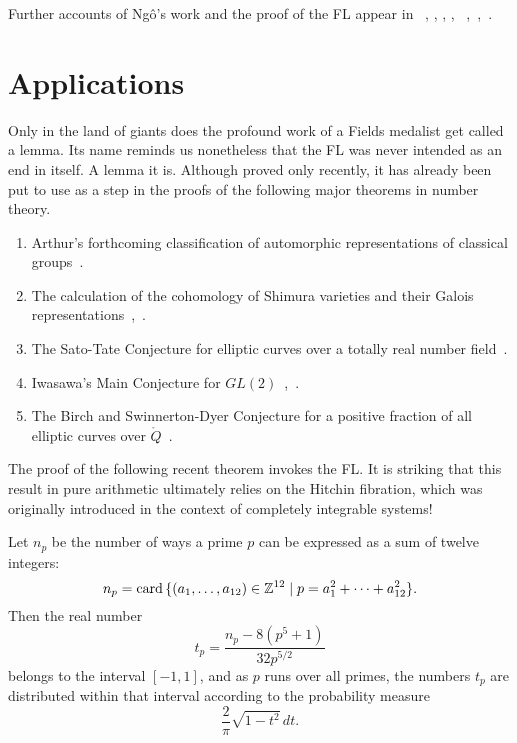 Further accounts of Ng\^o's work and the proof of the FL appear in
~\cite{Nadler:2010}, \cite{Dat:2004}, \cite{Arthur:2010},
\cite{DN:2010},
~\cite{CHLaumon:2010},~\cite{Cass:2010},~\cite{NBC:report:2010}.




\section{Applications}

Only in the land of giants does the profound work of a Fields medalist get
called a lemma.  Its name reminds us nonetheless that the FL was never
intended as an end in itself.  A lemma it is.  Although proved only
recently, it has already been put to use as a step in the proofs of
the following major theorems in number theory.

\begin{enumerate}
\item Arthur's forthcoming classification of automorphic
  representations of classical groups~\cite{Arthur:2011}.
\item The calculation of the cohomology of Shimura
  varieties and their Galois representations~\cite{Morel:2010},~\cite{Shin:2010}.
\item The Sato-Tate Conjecture for elliptic curves over a totally real
  number field~\cite{BGHT:2010}.
\item Iwasawa's Main Conjecture for
  $GL(2)$~\cite{Skinner-Urban:2010},~\cite{Skinner:2010}.
\item The Birch and Swinnerton-Dyer Conjecture  for a
positive fraction of all elliptic curves over $\ring{Q}$~\cite{BS:2010}.
\end{enumerate}

The proof of the following recent theorem invokes the FL.  
It is striking that this result in pure
arithmetic ultimately relies on the Hitchin fibration, which
was originally introduced in the context of completely integrable
systems!

\begin{thm} 
  Let $n_p$ be the number of ways a prime $p$ can be expressed as a
  sum of twelve integers:
\[
n_p = {\operatorname{card}}\,\{ (a_1,\ldots,a_{12})\in\mathbb{Z}^{12} \mid p = a_1^2 +\cdots +
  a_{12}^2 \}.
\]
Then the real number
\[
t_p = \frac{n_p -  8 (p^5 + 1)}{32 p^{5/2}}
\]
belongs to the interval $[-1,1]$, and as $p$ runs over all primes, the
numbers $t_p$ are distributed within that interval according to the
probability measure
\[
\frac{2}{\pi} \sqrt{1-t^2} \, dt.
\]
\end{thm}


